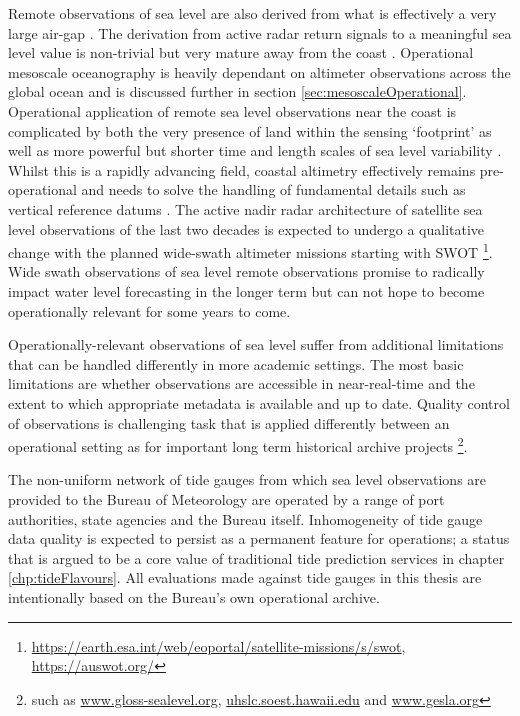 Remote observations of sea level are also derived from what is effectively a very large air-gap .   The derivation from active radar return signals to a meaningful sea level value is non-trivial but very mature away from the coast \citep{Fu:2001ub}.  Operational mesoscale oceanography is heavily dependant on altimeter observations across the global ocean and is discussed further in section \ref{sec:mesoscaleOperational}.  
Operational application of remote sea level observations near the coast is complicated by both the very presence of land within the sensing `footprint' as well as more powerful but shorter time and length scales of sea level variability \citep{Vignudelli:2011wl}.   Whilst this is a  rapidly advancing field, coastal altimetry effectively remains pre-operational and needs to solve the handling of fundamental details such as vertical reference datums \citep{10.3389/fmars.2020.549467}.
The active nadir radar architecture of satellite sea level observations of the last two decades is expected to undergo a qualitative change with the planned wide-swath altimeter missions starting with SWOT \footnote{\url{https://earth.esa.int/web/eoportal/satellite-missions/s/swot}, \url{https://auswot.org/}}.   Wide swath observations of sea level remote observations promise to radically impact water level forecasting in the longer term but can not hope to become operationally relevant for some years to come. 

Operationally-relevant observations of sea level suffer from additional limitations that can be handled differently in more academic settings.   The most basic limitations are whether observations are accessible in near-real-time and the extent to which appropriate metadata is available and up to date.  
Quality control of observations is challenging task that is applied differently between an operational setting as for important long term historical archive projects \footnote{such as \url{www.gloss-sealevel.org}, \url{uhslc.soest.hawaii.edu} and \url{www.gesla.org}}.

The non-uniform network of tide gauges from which sea level observations are provided to the Bureau of Meteorology are operated by a range of port authorities, state agencies and the Bureau itself. Inhomogeneity of tide gauge data quality is expected to persist as a permanent feature for operations; a status that is argued to be a core value of traditional tide prediction services in chapter \ref{chp:tideFlavours}. All evaluations made against tide gauges in this thesis are intentionally based on the Bureau's own operational archive.

